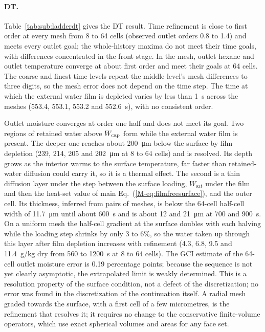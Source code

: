 \documentclass[11pt]{article}
\begin{document}
\paragraph{DT.}
Table~\ref{tab:sub:ladderdt} gives the DT result. Time refinement is
close to first order at every mesh from 8 to 64 cells (observed outlet
orders 0.8 to 1.4) and meets every outlet goal;
the whole-history maxima do not meet their time goals, with differences
concentrated in the front stage. In the mesh, outlet hexane and outlet
temperature converge at about first order and meet their goals at
64 cells. The coarse and finest time levels repeat the middle level's mesh
differences to three digits, so the mesh error does not depend on the time
step. The time at which the external water film is depleted varies by
less than 1~s across the meshes (553.4, 553.1, 553.2 and 552.6~s), with no
consistent order.

Outlet moisture converges at order one half and does not meet its goal.
Two regions of retained water above $W_{\mathrm{cap}}$ form while the external
water film is present.
The deeper one reaches about \SI{200}{\micro\metre} below the surface by
film depletion (239, 214, 205 and \SI{202}{\micro\metre} at 8 to 64 cells)
and is resolved. Its depth grows as the interior warms to the surface
temperature, far faster than retained-water diffusion could carry it, so it
is a thermal effect. The second is a thin diffusion layer under the step
between the surface loading, $W_{\mathrm{sat}}$ under the film and then
the heat-set value of main Eq.~(\ref*{M-eq:filmfreesurface}), and the
outer cell. Its thickness, inferred from pairs of meshes, is below the
64-cell half-cell width of \SI{11.7}{\micro\metre} until about 600~s and is
about 12 and \SI{21}{\micro\metre} at 700 and 900~s. On a uniform mesh the
half-cell gradient at the surface doubles with each halving while the
loading step shrinks by only 3 to 6\%, so the water taken up through
this layer after film depletion increases with refinement (4.3, 6.8, 9.5
and 11.4~g/kg dry from 560 to 1200~s at 8 to 64 cells). The GCI estimate
of the 64-cell outlet moisture error is 0.19 percentage points; because the
sequence is not yet clearly asymptotic, the extrapolated limit is weakly
determined. This is a resolution property of the surface condition, not a
defect of the discretization; no error was found in the discretization
of the continuation itself.
A radial mesh graded towards the surface, with a first cell of a few
micrometres, is the refinement that resolves it; it requires no change to
the conservative finite-volume operators, which use exact spherical
volumes and areas for any face set.
\end{document}
